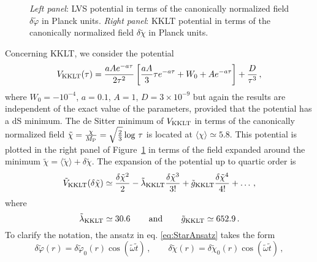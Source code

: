 \documentclass[11pt,a4paper]{article}
\begin{document}
\begin{figure}
\hfill
{}
\caption{\textit{Left panel}: LVS potential in terms of the canonically normalized field $\delta \tilde{\varphi}$ in Planck units. \textit{Right panel}: KKLT potential in terms of the canonically normalized field $\delta \tilde{\chi}$ in Planck units.}
\label{fig:Potentials}
\end{figure}

Concerning KKLT, we consider the potential~\cite{Kachru:2003aw}
\begin{equation}
V_{\rm KKLT}(\tau) = \frac{a A e^{-a \tau}}{2 \tau^2} \left[\frac{a A}{3} \tau e^{-a \tau} + W_0 + A e^{-a \tau}\right] + \frac{D}{\tau^3} \,,
\end{equation}
where $W_0 = - 10^{-4}$, $a=0.1$, $A=1$, $D = 3 \times 10^{-9}$ but again the results are independent of the exact value of the parameters, provided that the potential has a dS minimum. The de Sitter minimum of $V_{\rm KKLT}$ in terms of the canonically normalized field $\tilde\chi = \frac{\chi}{M_{\rm P}} = \sqrt{\frac{2}{3}} \log\,\tau$ is located at $\langle\chi\rangle \simeq 5.8$. This potential is plotted in the right panel of Figure~\ref{fig:Potentials} in terms of the field expanded around the minimum $\tilde{\chi} = \langle\tilde{\chi}\rangle + \delta\tilde{\chi}$. The expansion of the potential up to quartic order is
\begin{equation}
\tilde{V}_{\rm KKLT}(\delta\tilde\chi) \simeq \frac{\delta\tilde\chi^2}{2} - \tilde{\lambda}_{\rm KKLT} \frac{\delta\tilde\chi^3}{3!} + \tilde{g}_{\rm KKLT}\frac{\delta\tilde\chi^4}{4!} + \dots \,,
\end{equation}
where
\begin{equation}
\label{eq:KKLTCoefficients}
\tilde{\lambda}_{\rm KKLT} \simeq 30.6 \, \qquad \text{and} \, \qquad \tilde{g}_{\rm KKLT} \simeq 652.9\,.
\end{equation}
To clarify the notation, the ansatz in eq. \eqref{eq:StarAnsatz} takes the form
\begin{equation}
\delta\tilde\varphi(r) = \delta \tilde\varphi_0(r) \cos \left(\tilde\omega \tilde{t}\right) \,, \qquad \delta\tilde\chi(r) = \delta \tilde\chi_0(r) \cos \left(\tilde\omega \tilde{t}\right) \,,
\end{equation}
\end{document}
